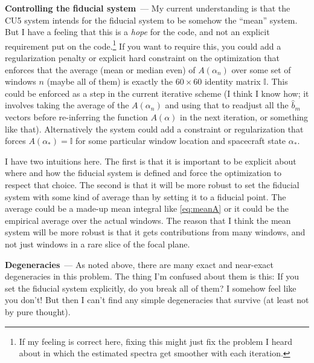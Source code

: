 \documentclass[11pt]{article}
\renewcommand{\paragraph}[1]{\medskip\par\noindent\textbf{#1}~---}
\begin{document}
\paragraph{Controlling the fiducial system}
My current understanding is that the CU5 system intends for the fiducial system to be somehow the ``mean'' system.
But I have a feeling that this is a \emph{hope} for the code, and not an explicit requirement put on the code.\footnote{If my feeling is correct here, fixing this might just fix the problem I heard about in which the estimated spectra get smoother with each iteration.}
If you want to require this, you could add a regularization penalty or explicit hard constraint on the optimization that enforces that the average (mean or median even) of $A(\alpha_n)$ over some set of windows $n$ (maybe all of them) is exactly the $60\times 60$ identity matrix $\mathbb{I}$.
This could be enforced as a step in the current iterative scheme (I think I know how; it involves taking the average of the $A(\alpha_n)$ and using that to readjust all the $\hat{b}_m$ vectors before re-inferring the function $A(\alpha)$ in the next iteration, or something like that).
Alternatively the system could add a constraint or regularization that forces $A(\alpha_\ast)=\mathbb{I}$ for some particular window location and spacecraft state $\alpha_\ast$.

I have two intuitions here.
The first is that it is important to be explicit about where and how the fiducial system is defined and force the optimization to respect that choice.
The second is that it will be more robust to set the fiducial system with some kind of average than by setting it to a fiducial point.
The average could be a made-up mean integral like \eqref{eq:meanA} or it could be the empirical average over the actual windows.
The reason that I think the mean system will be more robust is that it gets contributions from many windows, and not just windows in a rare slice of the focal plane.

\paragraph{Degeneracies}
As noted above, there are many exact and near-exact degeneracies in this problem.
The thing I'm confused about them is this: If you set the fiducial system explicitly, do you break all of them?
I somehow feel like you don't!
But then I can't find any simple degeneracies that survive (at least not by pure thought).
\end{document}

